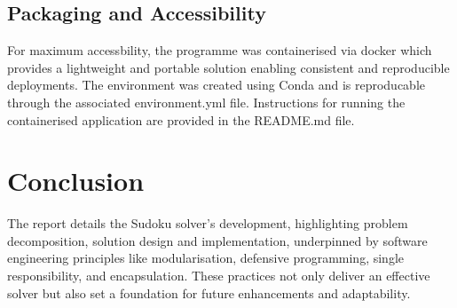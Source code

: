 \documentclass[11pt]{article}
\begin{document}
\subsection{Packaging and Accessibility}
For maximum accessbility, the programme was containerised via docker which provides a lightweight and portable solution enabling consistent and reproducible deployments. The environment was created using Conda and is reproducable through the associated environment.yml file. Instructions for running the containerised application are provided in the README.md file.

\section{Conclusion}
The report details the Sudoku solver's development, highlighting problem decomposition, solution design and implementation, underpinned by software engineering principles like modularisation, defensive programming, single responsibility, and encapsulation. These practices not only deliver an effective solver but also set a foundation for future enhancements and adaptability.



\end{document}
